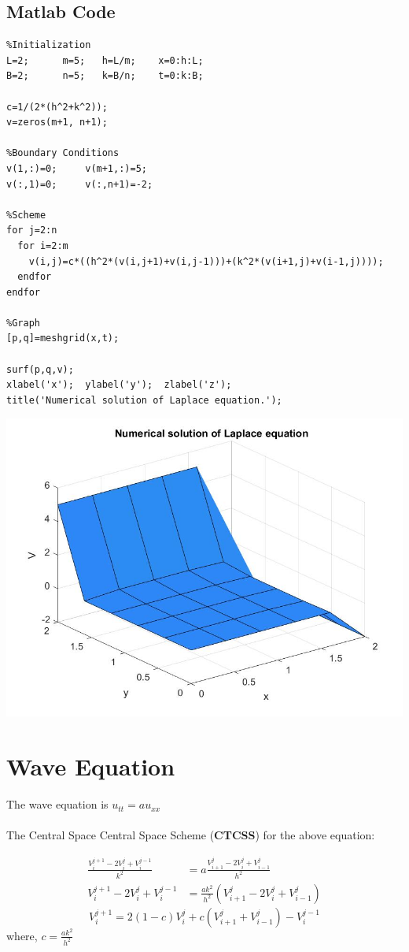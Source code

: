 \documentclass[a4paper,14pt,twoside,onecolumn,openany,final]{memoir}
\begin{document}
\section{Matlab Code}
\begin{verbatim}
%Initialization
L=2;      m=5;   h=L/m;    x=0:h:L;
B=2;      n=5;   k=B/n;    t=0:k:B;

c=1/(2*(h^2+k^2));
v=zeros(m+1, n+1);

%Boundary Conditions
v(1,:)=0;     v(m+1,:)=5;
v(:,1)=0;     v(:,n+1)=-2;

%Scheme
for j=2:n
  for i=2:m
    v(i,j)=c*((h^2*(v(i,j+1)+v(i,j-1)))+(k^2*(v(i+1,j)+v(i-1,j))));
  endfor
endfor

%Graph
[p,q]=meshgrid(x,t);

surf(p,q,v);
xlabel('x');  ylabel('y');  zlabel('z');
title('Numerical solution of Laplace equation.');
\end{verbatim}
\includegraphics[scale=0.32]{laplace.jpg}

\chapter{Wave Equation}

The wave equation is \hspace{5mm} \(u_{tt}=au_{xx}\) \\ \\

The Central Space Central Space Scheme (\textbf{CTCSS}) for the above equation:

\begin{align*}
  \frac{V_i^{j+1}-2V_i^j+V_i^{j-1}}{k^2} &=  a \frac{V_{i+1}^j-2V_i^j+V_{i-1}^j}{h^2}\\
  V_i^{j+1}-2V_i^j+V_i^{j-1} &= \frac{ak^2}{h^2}(V_{i+1}^j-2V_i^j+V_{i-1}^j)
 \end{align*}
\begin{equation}
  V_i^{j+1} = 2(1-c)V_i^j + c(V_{i+1}^j+V_{i-1}^j)  - V_i^{j-1}
\end{equation}
where, \hspace{5mm} \(c=\frac{ak^2}{h^2}\) \\
\end{document}

